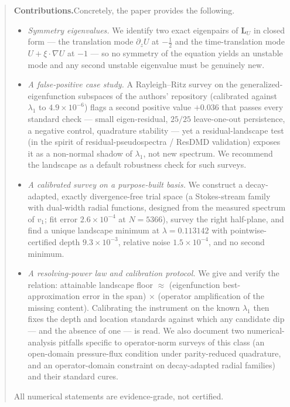 \documentclass[11pt]{article}
\newcommand{\LU}{\mathbf{L}_{U}}
\theoremstyle{plain}
\theoremstyle{remark}
\begin{document}
\begin{abstract}
\smallskip
\noindent\textbf{Contributions.}\enspace Concretely, the paper provides
the following.
\begin{itemize}
\item \emph{Symmetry eigenvalues.} We identify two exact eigenpairs of
$\LU$ in closed form --- the translation mode $\partial_z U$ at
$-\tfrac12$ and the time-translation mode $U+\xi\!\cdot\!\nabla U$ at
$-1$ --- so no symmetry of the equation yields an unstable mode and any
second unstable eigenvalue must be genuinely new.
\item \emph{A false-positive case study.} A Rayleigh--Ritz survey on the
generalized-eigenfunction subspaces of the authors' repository
(calibrated against $\lambda_1$ to $4.9\times10^{-6}$) flags a second
positive value $+0.036$ that passes every standard check --- small
eigen-residual, $25/25$ leave-one-out persistence, a negative control,
quadrature stability --- yet a residual-landscape test (in the spirit
of residual-pseudospectra / ResDMD validation) exposes it as a
non-normal shadow of $\lambda_1$, not new spectrum. We recommend the
landscape as a default robustness check for such surveys.
\item \emph{A calibrated survey on a purpose-built basis.} We construct
a decay-adapted, exactly divergence-free trial space (a Stokes-stream
family with dual-width radial functions, designed from the measured
spectrum of $v_1$; fit error $2.6\times10^{-4}$ at $N{=}5366$), survey
the right half-plane, and find a unique landscape minimum at
$\lambda=0.113142$ with pointwise-certified depth $9.3\times10^{-3}$,
relative noise $1.5\times10^{-4}$, and no second minimum.
\item \emph{A resolving-power law and calibration protocol.} We give and
verify the relation: attainable landscape floor $\approx$
(eigenfunction best-approximation error in the span) $\times$ (operator
amplification of the missing content). Calibrating the instrument on
the known $\lambda_1$ then fixes the depth and location standards
against which any candidate dip --- and the absence of one --- is read.
We also document two numerical-analysis pitfalls specific to
operator-norm surveys of this class (an open-domain pressure-flux
condition under parity-reduced quadrature, and an operator-domain
constraint on decay-adapted radial families) and their standard cures.
\end{itemize}
All numerical statements are evidence-grade, not certified.
\end{abstract}

\tableofcontents
\bigskip
\end{document}
